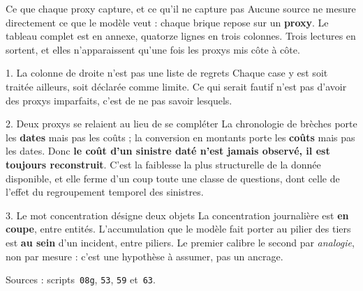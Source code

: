 \documentclass[11pt]{beamer}
\begin{document}
\begin{frame}{Ce que chaque proxy capture, et ce qu'il ne capture pas}
\scriptsize
Aucune source ne mesure directement ce que le modèle veut : chaque brique repose sur un
\textbf{proxy}. Le tableau complet est en annexe, quatorze lignes en trois colonnes. Trois
lectures en sortent, et elles n'apparaissent qu'une fois les proxys mis côte à côte.
\vspace{1.5mm}
\begin{block}{1. La colonne de droite n'est pas une liste de regrets}
Chaque case y est soit traitée ailleurs, soit déclarée comme limite. Ce qui serait fautif n'est
pas d'avoir des proxys imparfaits, c'est de ne pas savoir lesquels.
\end{block}
\vspace{-1.5mm}
\begin{block}{2. Deux proxys se relaient au lieu de se compléter}
La chronologie de brèches porte les \textbf{dates} mais pas les coûts ; la conversion en montants
porte les \textbf{coûts} mais pas les dates. Donc \textbf{le coût d'un sinistre daté n'est jamais
observé, il est toujours reconstruit}. C'est la faiblesse la plus structurelle de la donnée
disponible, et elle ferme d'un coup toute une classe de questions, dont celle de l'effet du
regroupement temporel des sinistres.
\end{block}
\vspace{-1.5mm}
\begin{block}{3. Le mot \og concentration \fg{} désigne deux objets}
La concentration journalière est \textbf{en coupe}, entre entités. L'accumulation que le modèle
fait porter au pilier des tiers est \textbf{au sein} d'un incident, entre piliers. Le premier
calibre le second par \emph{analogie}, non par mesure : c'est une hypothèse à assumer, pas un
ancrage.
\end{block}
\vspace{-1mm}
{\scriptsize Sources : scripts~\texttt{08g}, \texttt{53}, \texttt{59} et~\texttt{63}.}
\end{frame}
\end{document}
